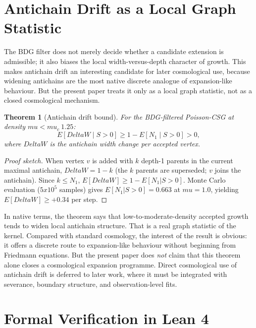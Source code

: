 \documentclass[11pt]{article}
\def\Delta{Delta}%
\def\mu{mu}%
\def\mathbb#1{#1}%
\def\times{x}%
\def\approx{~}%
\newtheorem{theorem}{Theorem}
\begin{document}
\section{Antichain Drift as a Local Graph Statistic}
\label{sec:drift}

The BDG filter does not merely decide whether a candidate extension is admissible; it also biases the local width-versus-depth character of growth. This makes antichain drift an interesting candidate for later cosmological use, because widening antichains are the most native discrete analogue of expansion-like behaviour. But the present paper treats it only as a local graph statistic, not as a closed cosmological mechanism.

\begin{theorem}[Antichain drift bound]
\label{thm:drift}
For the BDG-filtered Poisson-CSG at density $\mu<\mu_c\approx 1.25$:
\begin{equation}
\mathbb{E}[\Delta W\mid S>0] \ge 1-\mathbb{E}[N_1\mid S>0] > 0,
\end{equation}
where $\Delta W$ is the antichain width change per accepted vertex.
\end{theorem}
\begin{proof}[Proof sketch]
When vertex $v$ is added with $k$ depth-1 parents in the current maximal antichain, $\Delta W=1-k$ (the $k$ parents are superseded; $v$ joins the antichain). Since $k\le N_1$, $\mathbb{E}[\Delta W]\ge 1-\mathbb{E}[N_1|S>0]$. Monte Carlo evaluation ($5\times 10^5$ samples) gives $\mathbb{E}[N_1|S>0]=0.663$ at $\mu=1.0$, yielding $\mathbb{E}[\Delta W]\ge +0.34$ per step.
\end{proof}

In native terms, the theorem says that low-to-moderate-density accepted growth tends to widen local antichain structure. That is a real graph statistic of the kernel. Compared with standard cosmology, the interest of the result is obvious: it offers a discrete route to expansion-like behaviour without beginning from Friedmann equations. But the present paper does \emph{not} claim that this theorem alone closes a cosmological expansion programme. Direct cosmological use of antichain drift is deferred to later work, where it must be integrated with severance, boundary structure, and observation-level fits.

\section{Formal Verification in Lean 4}
\label{sec:lean}
\end{document}
